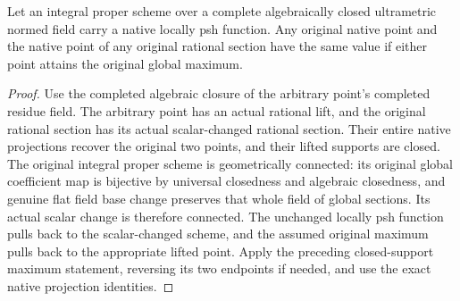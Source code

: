 \begin{lemma}
\label{lem:fc-integral-proper-rational-comparison}
\leanok
{}
Let an integral proper scheme over a complete algebraically closed ultrametric
normed field carry a native locally psh function. Any original native point
and the native point of any original rational section have the same value if
either point attains the original global maximum.
\end{lemma}
\begin{proof}
Use the completed algebraic closure of the arbitrary point's completed residue
field. The arbitrary point has an actual rational lift, and the original
rational section has its actual scalar-changed rational section. Their entire
native projections recover the original two points, and their lifted supports
are closed. The original integral proper scheme is geometrically connected:
its original global coefficient map is bijective by universal closedness and
algebraic closedness, and genuine flat field base change preserves that whole
field of global sections. Its actual scalar change is therefore connected.
The unchanged locally psh function pulls back to the scalar-changed scheme,
and the assumed original maximum pulls back to the appropriate lifted point.
Apply the preceding closed-support maximum statement, reversing its two
endpoints if needed, and use the exact native projection identities.
\end{proof}

